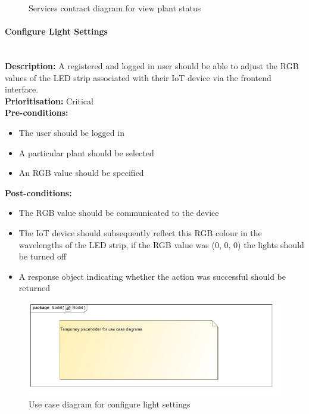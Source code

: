 \documentclass{article}
\begin{document}
		\begin{figure}[H]
			\caption{Services contract diagram for view plant status}
		\end{figure}
		
	\paragraph{Configure Light Settings}\mbox{}\\
		\textbf{Description:} A registered and logged in user should be able to adjust the RGB values of the LED strip associated with their IoT device via the frontend interface.\\
		\textbf{Prioritisation:} Critical\\		
		\textbf{Pre-conditions:}
			\begin{itemize}
				\item The user should be logged in
				\item A particular plant should be selected
				\item An RGB value should be specified
			\end{itemize}
		\textbf{Post-conditions:}
			\begin{itemize}
				\item The RGB value should be communicated to the device
				\item The IoT device should subsequently reflect this RGB colour in the wavelengths of the LED strip, if the RGB value was (0, 0, 0) the lights should be turned off
				\item A response object indicating whether the action was successful should be returned
			\end{itemize}

		\begin{figure}[H]
			\includegraphics[width=\linewidth]{images/tempUseCase.jpg}
			\caption{Use case diagram for configure light settings}
		\end{figure}
		
\end{document}
